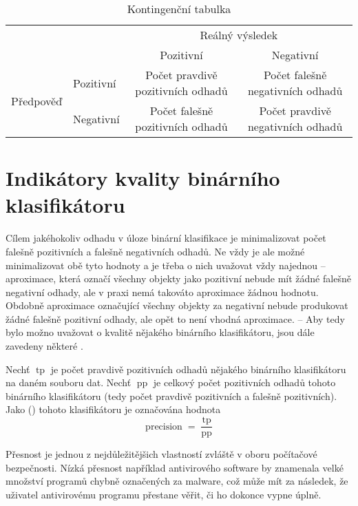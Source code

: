 \begin{table}[h]
	\caption{Kontingenční tabulka}\label{contingency_table}
	\centering
	\begin{tabular}{llcc}
		\toprule
		&& \multicolumn{2}{c}{Reálný výsledek} \\
		\cmidrule(l){3-4}
		&& Pozitivní & Negativní \\
		\cmidrule{3-4}
		\multirow{2}{*}{Předpověď} & \multicolumn{1}{l|}{Pozitivní} & Počet pravdivě pozitivních odhadů & Počet falešně negativních odhadů \\
		& \multicolumn{1}{l|}{Negativní} & Počet falešně pozitivních odhadů & Počet pravdivě negativních odhadů \\
		\bottomrule
	\end{tabular}
\end{table}

\section{Indikátory kvality binárního klasifikátoru}\label{quality_indicators}
Cílem jakéhokoliv odhadu v úloze binární klasifikace je minimalizovat počet falešně pozitivních a falešně negativních odhadů. Ne vždy je ale možné minimalizovat obě tyto hodnoty a je třeba o nich uvažovat vždy najednou -- aproximace, která označí všechny objekty jako pozitivní nebude mít žádné falešně negativní odhady, ale v praxi nemá takováto aproximace žádnou hodnotu. Obdobně aproximace označující všechny objekty za negativní nebude produkovat žádné falešně pozitivní odhady, ale opět to není vhodná aproximace. -- Aby tedy bylo možno uvažovat o kvalitě nějakého binárního klasifikátoru, jsou dále zavedeny některé .

\begin{define}
	Nechť \( \operatorname{tp} \) je počet pravdivě pozitivních odhadů nějakého binárního klasifikátoru na daném souboru dat. Nechť \( \operatorname{pp} \) je celkový počet pozitivních odhadů tohoto binárního klasifikátoru (tedy počet pravdivě pozitivních a falešně pozitivních). Jako  () tohoto klasifikátoru je označována hodnota
	\[ \operatorname{precision} = \frac{\operatorname{tp}}{\operatorname{pp}} \]
\end{define}

Přesnost je jednou z nejdůležitějšich vlastností zvláště v oboru počítačové bezpečnosti. Nízká přesnost například antivirového software by znamenala velké množství programů chybně označených za malware, což může mít za následek, že uživatel antivirovému programu přestane věřit, či ho dokonce vypne úplně.


